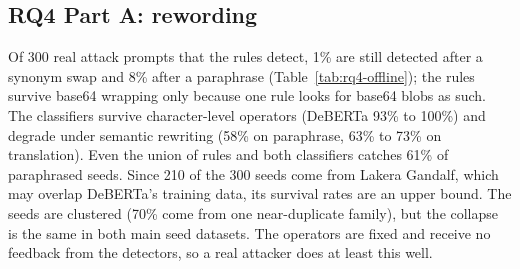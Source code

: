 \subsection{RQ4 Part A: rewording}
\label{sec:rq4a}

Of 300 real attack prompts that the rules detect, 1\% are still detected after a synonym swap and 8\%
after a paraphrase (Table~\ref{tab:rq4-offline}); the rules survive base64 wrapping only because one
rule looks for base64 blobs as such. The classifiers survive character-level operators (DeBERTa 93\%
to 100\%) and degrade under semantic rewriting (58\% on paraphrase, 63\% to 73\% on translation).
Even the union of rules and both classifiers catches 61\% of paraphrased seeds. Since 210 of the 300
seeds come from Lakera Gandalf, which may overlap DeBERTa's training data, its survival rates are an
upper bound. The seeds are
clustered (70\% come from one near-duplicate family), but the collapse is the same in both main seed
datasets. The operators are fixed and receive no feedback from the detectors, so a real attacker does
at least this well.

\begin{table}[t]\centering\small

\caption{Share of 300 detected attack prompts still detected after each fixed operator (Wilson 95\% CI;
some LLM rewrites failed and were dropped).}
\label{tab:rq4-offline}
\end{table}
